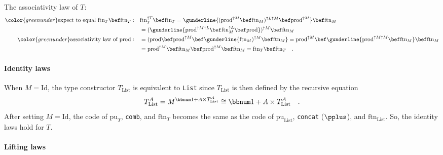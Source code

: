 The associativity law of $T$:
\begin{align*}
{\color{greenunder}\text{expect to equal }\text{ftn}_{T}\bef\text{ftn}_{T}:}\quad & \text{ftn}_{T}^{\uparrow T}\bef\text{ftn}_{T}=\gunderline{(\text{prod}^{\uparrow M}\bef\text{ftn}_{M})^{\uparrow L\uparrow M}\bef\text{prod}^{\uparrow M}}\bef\text{ftn}_{M}\\
 & =(\gunderline{\text{prod}^{\uparrow M\uparrow L}\bef\text{ftn}_{M}^{\uparrow L}\bef\text{prod}})^{\uparrow M}\bef\text{ftn}_{M}\\
{\color{greenunder}\text{associativity law of }\text{prod}:}\quad & =(\text{prod}\bef\text{prod}^{\uparrow M}\bef\gunderline{\text{ftn}_{M})^{\uparrow M}\bef\text{ftn}_{M}}=\text{prod}^{\uparrow M}\bef\gunderline{\text{prod}^{\uparrow M\uparrow M}\bef\text{ftn}_{M}}\bef\text{ftn}_{M}\\
 & =\text{prod}^{\uparrow M}\bef\text{ftn}_{M}\bef\text{prod}^{\uparrow M}\bef\text{ftn}_{M}=\text{ftn}_{T}\bef\text{ftn}_{T}\quad.
\end{align*}


\paragraph{Identity laws}

When $M=\text{Id}$, the type constructor $T_{\text{List}}$ is equivalent
to \lstinline!List! since $T_{\text{List}}$ is then defined by the
recursive equation 
\[
T_{\text{List}}^{A}=M^{\bbnum 1+A\times T_{\text{List}}^{A}}\cong\bbnum 1+A\times T_{\text{List}}^{A}\quad.
\]
After setting $M=\text{Id}$, the code of $\text{pu}_{T}$, \lstinline!comb!,
and $\text{ftn}_{T}$ becomes the same as the code of $\text{pu}_{\text{List}}$,
\lstinline!concat! ($\pplus$), and $\text{ftn}_{\text{List}}$.
So, the identity laws hold for $T$.

\paragraph{Lifting laws}

